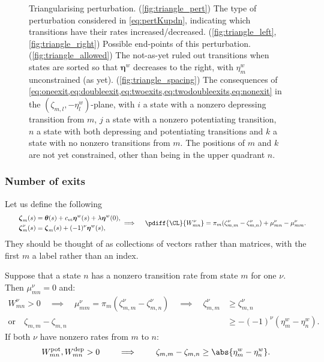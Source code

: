 \documentclass[12pt]{article}
\newcommand{\eqm}{\pi}
\newcommand{\etwm}{\eta^w}
\newcommand{\etw}{\boldsymbol{\eta}^w}
\newcommand{\thbm}{\theta}
\newcommand{\thb}{\boldsymbol{\thbm}}
\newcommand{\dgnm}{\zeta}
\newcommand{\dgn}{\boldsymbol{\dgnm}}
\newcommand{\Wm}{W}
\newcommand{\pot}{^{\text{pot}}}
\newcommand{\dep}{^{\text{dep}}}
\begin{document}
\begin{figure}[ht]
\begin{center}
\begin{myenuma}
\end{myenuma}
\caption[Triangularising perturbation]{Triangularising perturbation.
(\ref*{fig:triangle_pert}) The type of perturbation considered in \cref{eq:pertKupdn}, indicating which transitions have their rates increased/decreased.
(\ref*{fig:triangle_left},\ref*{fig:triangle_right}) Possible end-points of this perturbation. 
(\ref*{fig:triangle_allowed}) The not-as-yet ruled out transitions when states are sorted so that \(\etw\) decreases to the right, with \(\etwm_m\) unconstrained (as yet).
(\ref*{fig:triangle_spacing}) The consequences of \cref{eq:oneexit,eq:doubleexit,eq:twoexits,eq:twodoubleexits,eq:nonexit} in the \( (\dgnm_{m,l},-\etwm_l) \)-plane, with \(i\) a state with a nonzero depressing transition from \(m\), \(j\) a state with a nonzero potentiating transition, \(n\) a state with both depressing and potentiating transitions and \(k\) a state with no nonzero transitions from \(m\).
The positions of \(m\) and \(k\) are not yet constrained, other than being in the upper quadrant \wrt \(n\).
\label{fig:triangle_s}}
\end{center}
\end{figure}


\subsubsection{Number of exits}\label{sec:exit}

Let us define the following
%
\begin{equation}\label{eq:degenerate}
\begin{aligned}
    \dgn_{m}(s) &= \thb(s) + c_m \etw(s) + \lambda \etw(0), \\
    \qquad
    \dgn^\nu_m(s) &= \dgn_m(s) + (-1)^\nu \etw(s),   
\end{aligned}
  \implies \quad
  \pdiff{\CL}{\Wm^\nu_{mn}} = \eqm_m (\dgnm^\nu_{m,m} - \dgnm^\nu_{m,n}) + \mu^\nu_{mn} - \mu^\nu_{mm}.
\end{equation}
%
They should be thought of as collections of vectors rather than matrices, with the first \(m\) a label rather than an index.

Suppose that a state \(n\) has a nonzero transition rate from state \(m\) for one \(\nu\).
Then \(\mu^\nu_{mn} = 0\) and:
%
\begin{equation}\label{eq:oneexit}
\begin{aligned}
  \Wm^\nu_{mn} > 0
  \quad \implies \quad
  \mu^\nu_{mm} = \eqm_m (\dgnm^\nu_{m,m} - \dgnm^\nu_{m,n})
  \quad \implies \quad
  \dgnm^\nu_{m,m} &\geq \dgnm^\nu_{m,n} \\
  \text{or} \quad
  \dgnm_{m,m} - \dgnm_{m,n} &\geq - (-1)^\nu (\etwm_m - \etwm_n).
\end{aligned}
\end{equation}
%
If both \(\nu\) have nonzero rates from \(m\) to \(n\):
%
\begin{equation}\label{eq:doubleexit}
  \Wm\pot_{mn}, \Wm\dep_{mn} > 0
  \qquad \implies \qquad
  \dgnm_{m,m} - \dgnm_{m,n} \geq \abs{\etwm_m - \etwm_n}.
\end{equation}
%
\end{document}
